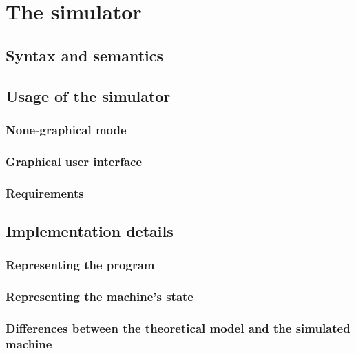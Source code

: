 \chapter{The simulator}
\section{Syntax and semantics}
\section{Usage of the simulator}
\subsection{None-graphical mode}
\subsection{Graphical user interface}
\subsection{Requirements}
\section{Implementation details}
\subsection{Representing the program}
\subsection{Representing the machine's state}
\subsection{Differences between the theoretical model and the simulated machine}
